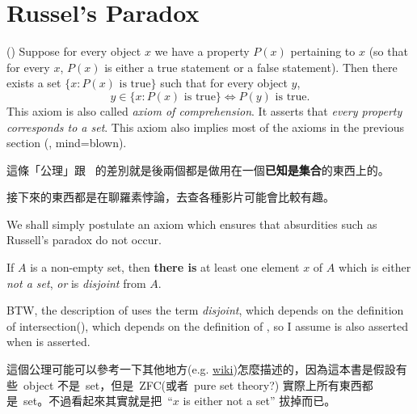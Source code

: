 \section{Russel's Paradox}\label{sec 3.2}

\begin{axiom}  \label{axm 3.8} ()
Suppose for every object \(x\) we have a property \(P(x)\) pertaining to \(x\) (so that for every \(x\), \(P(x)\) is either a true statement or a false statement). Then there exists a set \( \{x : P(x) \text{\ is true} \} \) such that for every object \(y\),
\[
    y \in \{x : P(x) \text{\ is true} \} \iff P(y) \text{\ is true}.
\]
This axiom is also called \emph{axiom of comprehension}. It asserts that \emph{every property corresponds to a set}. This axiom also implies most of the axioms in the previous section (, mind=blown).
\end{axiom}

\begin{note}
這條「公理」跟\   的差別就是後兩個都是做用在一個\textbf{已知是集合}的東西上的。
\end{note}

\begin{note}
接下來的東西都是在聊羅素悖論，去查各種影片可能會比較有趣。
\end{note}

\begin{note}
We shall simply postulate an axiom which ensures that absurdities such as Russell’s paradox do not occur.
\end{note}

\begin{axiom} \label{axm 3.9}
If \(A\) is a non-empty set, then \textbf{there is} at least one element \(x\) of \(A\) which is either \textit{not a set}, \textit{or} is \textit{disjoint} from \(A\).
\end{axiom}

\begin{note}
BTW, the description of  uses the term \emph{disjoint}, which depends on the definition of intersection(), which depends on the definition of , so I assume  is also asserted when  is asserted.
\end{note}

\begin{note}
這個公理可能可以參考一下其他地方(e.g. \href{https://www.wikiwand.com/en/Axiom_of_regularity}{wiki})怎麼描述的，因為這本書是假設有些\ object 不是\ set，但是\ ZFC(或者\ pure set theory?) 實際上所有東西都是\ set。不過看起來其實就是把\ ``\(x\) is either not a set'' 拔掉而已。
\end{note}

